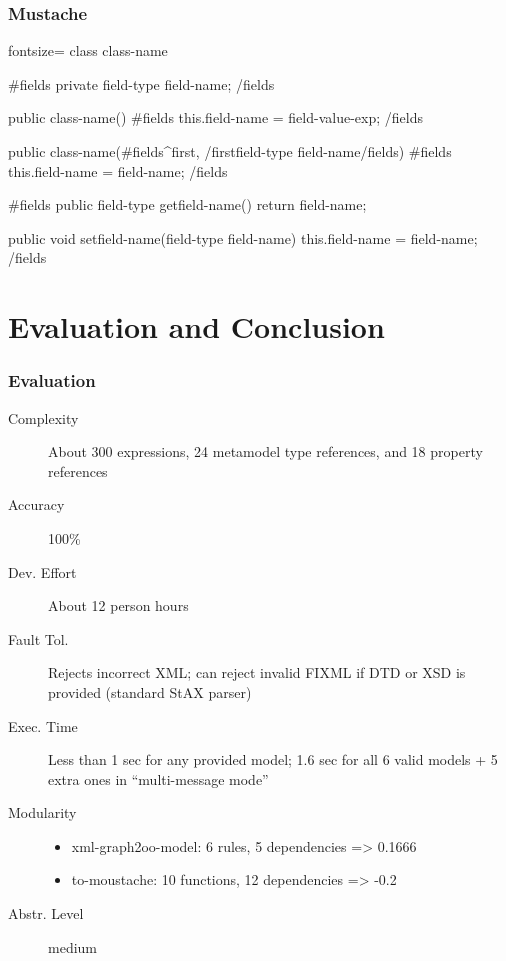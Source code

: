 \documentclass{beamer}
\begin{document}
\begin{frame}[fragile]
  \frametitle{Mustache}
  \begin{clojurecode*}{fontsize=\tiny}
class {{{class-name}}} {
    {{#fields}}
    private {{{field-type}}} {{{field-name}}};
    {{/fields}}

    public {{{class-name}}}() {
        {{#fields}}
        this.{{{field-name}}} = {{{field-value-exp}}};
        {{/fields}}
    }

    public {{{class-name}}}({{#fields}}{{^first}}, {{/first}}{{{field-type}}} {{{field-name}}}{{/fields}}) {
        {{#fields}}
        this.{{{field-name}}} = {{{field-name}}};
        {{/fields}}
    }

    {{#fields}}
    public {{{field-type}}} get{{{field-name}}}() {
        return {{{field-name}}};
    }

    public void set{{{field-name}}}({{{field-type}}} {{{field-name}}}) {
        this.{{{field-name}}} = {{{field-name}}};
    }
    {{/fields}}
}
  \end{clojurecode*}
\end{frame}

\section{Evaluation and Conclusion}

\begin{frame}
  \frametitle{Evaluation}
  \begin{description}
  \item[Complexity] About 300 expressions, 24 metamodel type references, and 18
    property references
  \item[Accuracy] 100\%
  \item[Dev. Effort] About 12 person hours
  \item[Fault Tol.] Rejects incorrect XML; can reject invalid FIXML if DTD or
    XSD is provided (standard StAX parser)
  \item[Exec. Time] Less than 1 sec for any provided model; 1.6 sec for all 6
    valid models + 5 extra ones in ``multi-message mode''
  \item[Modularity]
    \begin{itemize}
    \item xml-graph2oo-model: 6 rules, 5 dependencies => 0.1666
    \item to-moustache: 10 functions, 12 dependencies => -0.2
    \end{itemize}
  \item[Abstr. Level] medium
  \end{description}
\end{frame}
\end{document}
